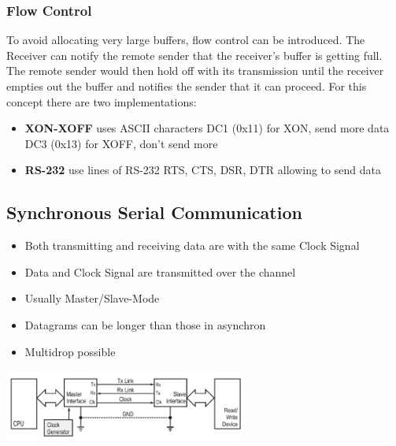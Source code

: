 \subsubsection{Flow Control}
To avoid allocating very large buffers, flow control can be introduced.
The Receiver can notify the remote sender that the receiver's buffer is getting full.
The remote sender would then hold off with its transmission until the receiver empties out the buffer and notifies the sender that it can proceed.
For this concept there are two implementations:
\begin{itemize}
	\item \textbf{XON-XOFF} uses ASCII characters
	\subitem DC1 (0x11) for XON, send more data
	\subitem DC3 (0x13) for XOFF, don't send more
	\item \textbf{RS-232} use lines of RS-232
	\subitem RTS, CTS, DSR, DTR allowing to send data
\end{itemize}
\subsection{Synchronous Serial Communication }
\begin{minipage}{11cm}
	\begin{itemize}
		\item Both transmitting and receiving data are with the same Clock Signal
		\item Data and Clock Signal are transmitted over the channel
		\item Usually Master/Slave-Mode
		\item Datagrams can be longer than those in asynchron
		\item Multidrop possible
	\end{itemize}
\end{minipage}
\begin{minipage}{8cm}
	\includegraphics[width=8cm]{images/syn.png}
\end{minipage}
\clearpage
\pagebreak
